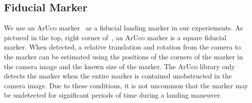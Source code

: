 
\subsection{Fiducial Marker}
We use an ArUco marker~\cite{romero2018speeded} as a fiducial landing marker
in our experiements. As pictured in the top, right corner of~, an ArUco
marker is a square fiducial marker. When detected, a relative translation and
rotation from the camera to the marker can be estimated using the positions of
the corners of the marker in the camera image and the known size of the marker. 
The ArUco library only detects the marker when the entire marker is contained
unobstructed in the camera image. Due to these
conditions, it is not uncommon that the marker may be undetected for significant
periods of time during a landing maneuver.

